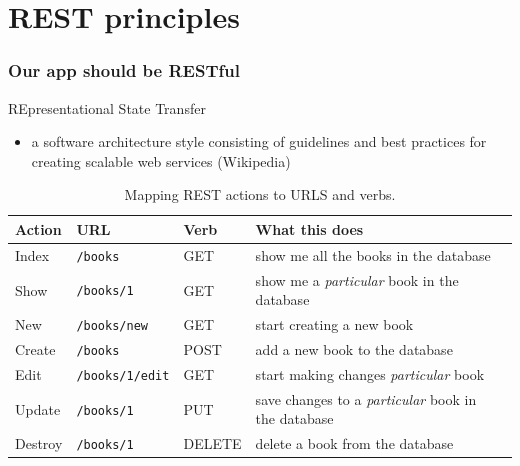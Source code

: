\documentclass[10pt,t,xcolor=dvipsnames]{beamer}
\begin{document}
\section{REST principles}
\begin{frame}[fragile]
\frametitle{Our app should be RESTful}
\pause
\alert{RE}presentational \alert{S}tate \alert{T}ransfer
\pause
\begin{itemize}[<+->]
\item a software architecture style consisting of guidelines and best practices for creating scalable web services (Wikipedia)
\end{itemize}
\pause
\begin{table}
\scriptsize
\centering
\begin{tabular}{|l|l|l|l|l|}\hline
Action  &URL&                  Verb  & What this does\\ \hline\hline
Index&  \texttt{/books}&       GET & show me all the books in the database\\ \hline
Show&   \texttt{/books/1}&     GET & show me a \textit{\alert{particular}} book in the database\\ \hline
New&    \texttt{/books/new}&   GET & start creating a new book\\ \hline
Create& \texttt{/books}&       POST & add a new book to the database\\ \hline
Edit&   \texttt{/books/1/edit}&GET & start making changes \textit{\alert{particular}} book \\ \hline
Update& \texttt{/books/1}&     PUT & save changes to a \textit{\alert{particular}} book in the database\\ \hline
Destroy&\texttt{/books/1}&     DELETE & delete a book from the database\\ \hline
\end{tabular}
\caption{\footnotesize Mapping REST actions to URLS and verbs.}
\end{table}
\end{frame}
\end{document}

